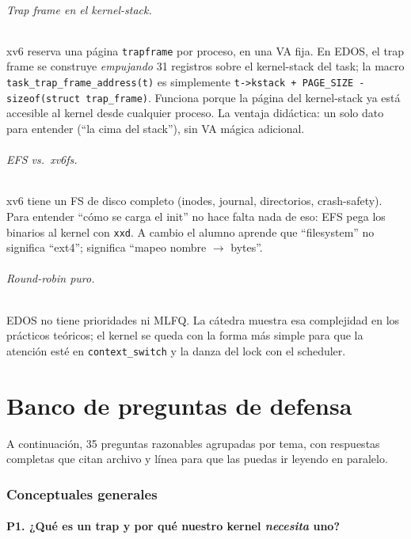 \documentclass[11pt,a4paper]{article}
\begin{document}
\paragraph{Trap frame en el kernel-stack.}
xv6 reserva una página \texttt{trapframe} por proceso, en una VA
fija. En EDOS, el trap frame se construye \emph{empujando} 31
registros sobre el kernel-stack del task; la macro
\texttt{task\_trap\_frame\_address(t)} es simplemente
\texttt{t->kstack + PAGE\_SIZE - sizeof(struct trap\_frame)}.
Funciona porque la página del kernel-stack ya está accesible al
kernel desde cualquier proceso. La ventaja didáctica: un solo dato
para entender (``la cima del stack''), sin VA mágica adicional.

\paragraph{EFS vs.\ xv6fs.}
xv6 tiene un FS de disco completo (inodes, journal, directorios,
crash-safety). Para entender ``cómo se carga el init'' no hace
falta nada de eso: EFS pega los binarios al kernel con \texttt{xxd}.
A cambio el alumno aprende que ``filesystem'' no significa
``ext4''; significa ``mapeo nombre $\to$ bytes''.

\paragraph{Round-robin puro.}
EDOS no tiene prioridades ni MLFQ. La cátedra muestra esa
complejidad en los prácticos teóricos; el kernel se queda con la
forma más simple para que la atención esté en \texttt{context\_switch}
y la danza del lock con el scheduler.

\part{Banco de preguntas de defensa}

A continuación, 35 preguntas razonables agrupadas por tema, con
respuestas completas que citan archivo y línea para que las puedas
ir leyendo en paralelo.

\section{Conceptuales generales}

\subsection*{P1. ¿Qué es un trap y por qué nuestro kernel \emph{necesita} uno?}
\end{document}
